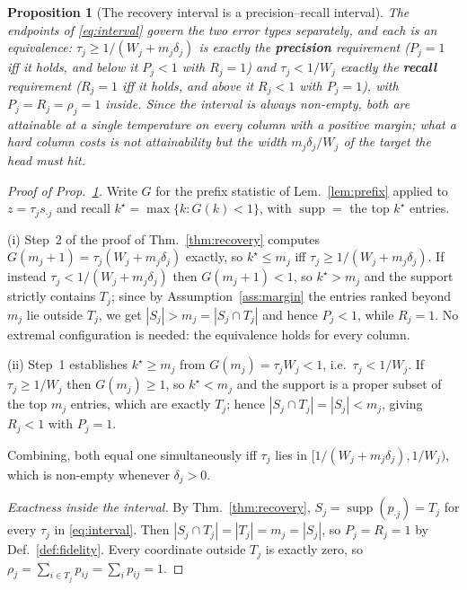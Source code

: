 \documentclass{article}
\newtheorem{proposition}{Proposition}
\newcommand{\supp}{\operatorname{supp}}
\begin{document}
\begin{proposition}[The recovery interval is a precision--recall interval]
\label{prop:printerval}
The endpoints of \eqref{eq:interval} govern the two error types separately, and each is an
equivalence: $\tau_j \ge 1/(W_j+m_j\delta_j)$ is exactly the \textbf{precision} requirement
($P_j=1$ iff it holds, and below it $P_j<1$ with $R_j=1$) and $\tau_j < 1/W_j$ exactly the
\textbf{recall} requirement ($R_j=1$ iff it holds, and above it $R_j<1$ with $P_j=1$), with
$P_j=R_j=\rho_j=1$ inside. Since the interval is always non-empty, both are attainable at a
single temperature on \emph{every} column with a positive margin; what a hard column costs is
not attainability but the \emph{width} $m_j\delta_j/W_j$ of the target the head must hit.
\end{proposition}

\begin{proof}[Proof of Prop.~\ref{prop:printerval}]
Write $G$ for the prefix statistic of Lem.~\ref{lem:prefix} applied to $z = \tau_j s_{\cdot j}$
and recall $k^\star = \max\{k : G(k) < 1\}$, with $\supp = $ the top $k^\star$ entries.

(i) Step~2 of the proof of Thm.~\ref{thm:recovery} computes $G(m_j{+}1)=\tau_j(W_j+m_j\delta_j)$
exactly, so $k^\star \leq m_j$ iff $\tau_j \geq 1/(W_j+m_j\delta_j)$. If instead
$\tau_j < 1/(W_j+m_j\delta_j)$ then $G(m_j{+}1)<1$, so $k^\star > m_j$ and the support strictly
contains $T_j$; since by Assumption~\ref{ass:margin} the entries ranked beyond $m_j$ lie outside
$T_j$, we get $|S_j| > m_j = |S_j \cap T_j|$ and hence $P_j < 1$, while $R_j = 1$. No extremal
configuration is needed: the equivalence holds for every column.

(ii) Step~1 establishes $k^\star \geq m_j$ from $G(m_j) = \tau_j W_j < 1$, i.e.\
$\tau_j < 1/W_j$. If $\tau_j \geq 1/W_j$ then $G(m_j) \geq 1$, so $k^\star < m_j$ and the
support is a proper subset of the top $m_j$ entries, which are exactly $T_j$; hence
$|S_j \cap T_j| = |S_j| < m_j$, giving $R_j < 1$ with $P_j = 1$.

Combining, both equal one simultaneously iff $\tau_j$ lies in
$[1/(W_j+m_j\delta_j), 1/W_j)$, which is non-empty whenever $\delta_j>0$.

\emph{Exactness inside the interval.} By Thm.~\ref{thm:recovery}, $S_j = \supp(p_{\cdot j}) = T_j$ for every $\tau_j$ in
\eqref{eq:interval}. Then $|S_j \cap T_j| = |T_j| = m_j = |S_j|$, so
$P_j = R_j = 1$ by Def.~\ref{def:fidelity}. Every coordinate outside $T_j$ is exactly zero, so
$\rho_j = \sum_{i \in T_j} p_{ij} = \sum_i p_{ij} = 1$.
\end{proof}
\end{document}
